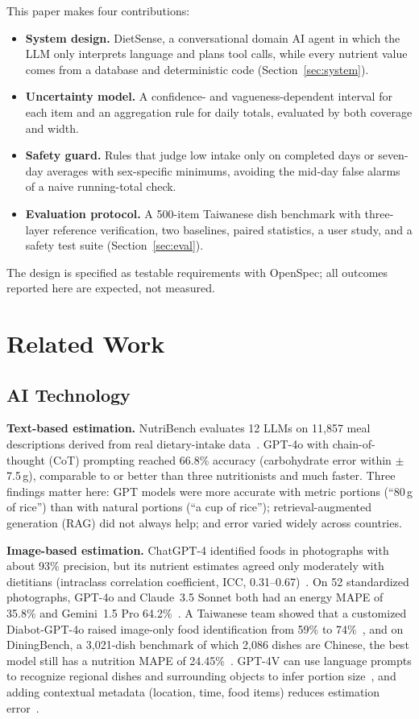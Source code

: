 \documentclass[conference]{IEEEtran}
\begin{document}
This paper makes four contributions:
\begin{itemize}
\item \textbf{System design.} DietSense, a conversational domain AI agent in which the LLM only interprets language and plans tool calls, while every nutrient value comes from a database and deterministic code (Section~\ref{sec:system}).
\item \textbf{Uncertainty model.} A confidence- and vagueness-dependent interval for each item and an aggregation rule for daily totals, evaluated by both coverage and width.
\item \textbf{Safety guard.} Rules that judge low intake only on completed days or seven-day averages with sex-specific minimums, avoiding the mid-day false alarms of a naive running-total check.
\item \textbf{Evaluation protocol.} A 500-item Taiwanese dish benchmark with three-layer reference verification, two baselines, paired statistics, a user study, and a safety test suite (Section~\ref{sec:eval}).
\end{itemize}
The design is specified as testable requirements with OpenSpec; all outcomes reported here are expected, not measured.

\section{Related Work}

\subsection{AI Technology}

\textbf{Text-based estimation.} NutriBench evaluates 12 LLMs on 11{,}857 meal descriptions derived from real dietary-intake data~\cite{hua2025}. GPT-4o with chain-of-thought (CoT) prompting reached 66.8\% accuracy (carbohydrate error within $\pm$7.5\,g), comparable to or better than three nutritionists and much faster. Three findings matter here: GPT models were more accurate with metric portions (``80\,g of rice'') than with natural portions (``a cup of rice''); retrieval-augmented generation (RAG) did not always help; and error varied widely across countries.

\textbf{Image-based estimation.} ChatGPT-4 identified foods in photographs with about 93\% precision, but its nutrient estimates agreed only moderately with dietitians (intraclass correlation coefficient, ICC, 0.31--0.67)~\cite{ohara2025}. On 52 standardized photographs, GPT-4o and Claude~3.5 Sonnet both had an energy MAPE of 35.8\% and Gemini~1.5 Pro 64.2\%~\cite{fridolfsson2025}. A Taiwanese team showed that a customized Diabot-GPT-4o raised image-only food identification from 59\% to 74\%~\cite{chen2025}, and on DiningBench, a 3{,}021-dish benchmark of which 2{,}086 dishes are Chinese, the best model still has a nutrition MAPE of 24.45\%~\cite{jin2026}. GPT-4V can use language prompts to recognize regional dishes and surrounding objects to infer portion size~\cite{lo2024}, and adding contextual metadata (location, time, food items) reduces estimation error~\cite{coburn2025}.
\end{document}
